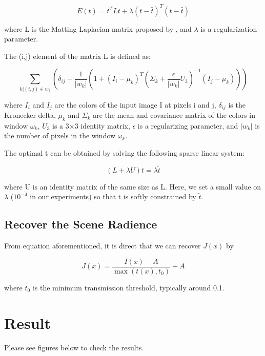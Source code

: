 \documentclass{article}
\begin{document}
        $$E(t) = t^{T} L t + \lambda (t - \bar{t})^{T} (t - \bar{t})$$

        where L is the Matting Laplacian matrix proposed by \cite{Anat}, and $\lambda$ is a regularization parameter.

        The (i,j) element of the matrix L is defined as:

        $$\sum_{k|(i, j) \in w_{k}} (\delta_{ij} - \frac{1}{|w_{k}|} (1 + (I_{i} - \mu_{k})^{T} (\Sigma_{k} + \frac{\epsilon}{|w_{k}|} U_{3})^{-1} (I_{j} - \mu_{k})))$$

        where $I_{i}$ and $I_{j}$ are the colors of the input image I at pixels i and j, $\delta_{ij}$ is the Kronecker delta, $\mu_{k}$ and $\Sigma_{k}$ are the mean and covariance matrix of the colors in window $\omega_{k}$, $U_{3}$ is a 3×3 identity matrix, $\epsilon$ is a regularizing parameter, and $|w_{k}|$ is the number of pixels in the window $\omega_{k}$.

        The optimal t can be obtained by solving the following sparse linear system:

        $$(L + \lambda U) t = \lambda \widetilde{t}$$

        where U is an identity matrix of the same size as L. Here, we set a small value on $\lambda$ ($10^{-4}$ in our experiments) so that t is softly constrained by $\widetilde{t}$.

    \subsection{Recover the Scene Radience}

        From equation aforementioned, it is direct that we can recover $J(x)$ by

        $$J(x) = \frac{I(x) - A}{\max(t(x), t_{0})} + A$$

        where $t_{0}$ is the minimum transmission threshold, typically around 0.1.

\section{Result}

    Please see figures below to check the results.
\end{document}
